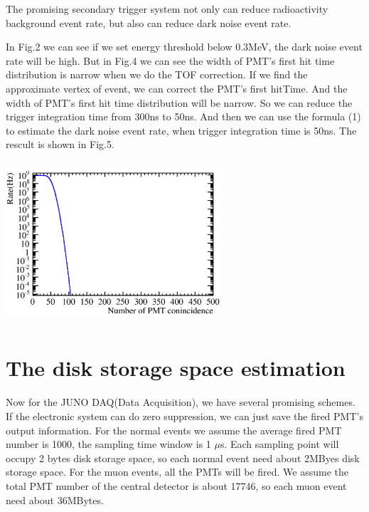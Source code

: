 \documentclass[a4paper,10pt,twoside]{paper}
\begin{document}
	\begin{multicols}{2}


		The promising secondary trigger system not only can
		reduce radioactivity background event rate, but also can
		reduce dark noise event rate.


		In Fig.2 we can see if we set energy threshold below
		0.3MeV, the dark noise event rate will be high. But in
		Fig.4 we can see the width of PMT's first hit time distribution
		is narrow when we do the TOF correction.
		If we find the approximate vertex of
		event, we can correct the PMT's first hitTime. And the
		width of PMT's first hit time distribution will be narrow.
		So we can reduce the trigger integration time from 300ns
		to 50ns. And then we can use the formula (1) to estimate
		the dark noise event rate, when trigger integration time
		is 50ns. The rescult is shown in Fig.5.


		\begin{center}
			\includegraphics[width=8cm,height=6cm]{Noise_rate_50kHz_50ns.eps}
		\end{center}


		\section{The disk storage space estimation}
		Now for the JUNO DAQ(Data Acquisition), we have several promising schemes. 
		If the electronic system can do zero suppression, we can just
		save the fired PMT's output information.
		For the normal
		events we assume the average fired PMT number is 1000, the sampling time window 
		is 1 $\mu$s. Each sampling point will occupy 2 bytes disk storage space, so each
		normal event need about 2MByes disk storage space. For the muon events, all the 
		PMTs will be fired. We assume the total PMT number of the central detector is about 
		17746, so each muon event need about 36MBytes.
		

\end{multicols}
\end{document}
